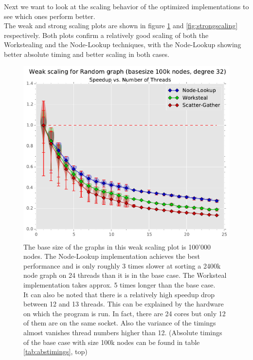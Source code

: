 Next we want to look at the scaling behavior of the optimized implementations to see which ones perform better. \\
The weak and strong scaling plots are shown in figure \ref{fig:weakscaling} and \ref{fig:strongscaling} respectively.
Both plots confirm a relatively good scaling of both the Workstealing and the Node-Lookup techniques, with the Node-Lookup showing better absolute timing and better scaling in both cases. \\
%
\begin{figure}[ht]
	\centering
	\includegraphics[width=\columnwidth]{plots/weakscaling_gtRANDOMLIN32_n1000000_deg32.pdf}
	\caption{The base size of the graphs in this weak scaling plot is 100'000 nodes.
		The Node-Lookup implementation achieves the best performance and is only roughly 3 times slower at sorting a 2400k node graph on 24 threads than it is in the base case. The Worksteal implementation takes approx. 5 times longer than the base case. \\
	It can also be noted that there is a relatively high speedup drop between 12 and 13 threads.
	This can be explained by the hardware on which the program is run. In fact, there are 24 cores but only 12 of them are on the same socket.
	Also the variance of the timings almost vanishes thread numbers higher than 12. (Absolute timings of the base case with size 100k nodes can be found in table \ref{tab:abstimings}, top)
}
	\label{fig:weakscaling}
\end{figure}
